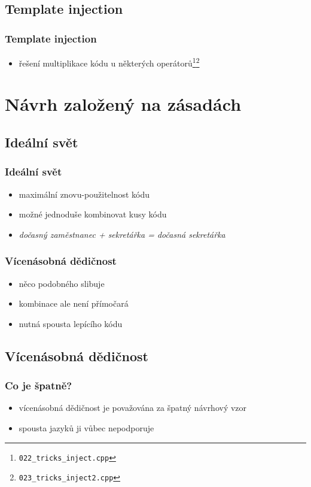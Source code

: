 	\subsection{Template injection}

	\begin{frame}
		\frametitle{Template injection}
		\begin{itemize}
			\item{řešení multiplikace kódu u některých operátorů\footnote{\texttt{022\_tricks\_inject.cpp}}\footnote{\texttt{023\_tricks\_inject2.cpp}}}
		\end{itemize}
	\end{frame}

	\section{Návrh založený na zásadách}
	\subsection{Ideální svět}

	\begin{frame}
		\frametitle{Ideální svět}
		\begin{itemize}
			\item{maximální znovu-použitelnost kódu}
			\item{možné jednoduše kombinovat kusy kódu}
			\item{\textit{dočasný zaměstnanec + sekretářka = dočasná sekretářka}}
		\end{itemize}
	\end{frame}

	\begin{frame}
		\frametitle{Vícenásobná dědičnost}
		\begin{itemize}
			\item{něco podobného slibuje}
			\item{kombinace ale není přímočará}
			\item{nutná spousta lepícího kódu}
		\end{itemize}
	\end{frame}

	\subsection{Vícenásobná dědičnost}

	\begin{frame}
		\frametitle{Co je špatně?}
		\begin{itemize}
			\item{vícenásobná dědičnost je považována za špatný návrhový vzor}
			\item{spousta jazyků ji vůbec nepodporuje}
		\end{itemize}
	\end{frame}


